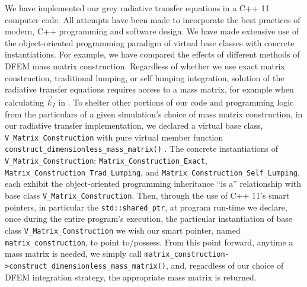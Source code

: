 We have implemented our grey radiative transfer equations in a C++ 11 computer code.
All attempts have been made to incorporate the best practices of modern, C++ programming and software design\cite{cpp_book,effective_cpp}.
We have made extensive use of the object-oriented programming paradigm of virtual base classes with concrete instantiations.
For example, we have compared the effects of different methods of DFEM mass matrix construction.
Regardless of whether we use exact matrix construction, traditional lumping, or self lumping integration, solution of the radiative transfer equations requires access to a mass matrix, for example when calculating $\vec{k}_I$ in .
To shelter other portions of our code and programming logic from the particulars of a given simulation's choice of mass matrix construction, in our radiative transfer implementation, we declared a virtual base class, \verb+V_Matrix_Construction+ with pure virtual member function \verb+construct_dimensionless_mass_matrix()+ .
The concrete instantiations of \verb+V_Matrix_Construction+: \verb+Matrix_Construction_Exact+, \verb+Matrix_Construction_Trad_Lumping+, and \verb+Matrix_Construction_Self_Lumping+, each exhibit the object-oriented programming inheritance ``is a'' relationship with base class \verb+V_Matrix_Construction+.
Then, through the use of C++ 11's smart pointers, in particular the \verb+std::shared_ptr+,  at program run-time we declare, once during the entire program's execution, the particular instantiation of base class \verb+V_Matrix_Construction+  we wish our smart pointer, named \verb+matrix_construction+, to point to/possess.
From this point forward, anytime a mass matrix is needed, we simply call \verb+matrix_construction->construct_dimensionless_mass_matrix()+, and, regardless of our choice of DFEM integration strategy, the appropriate mass matrix is returned.


